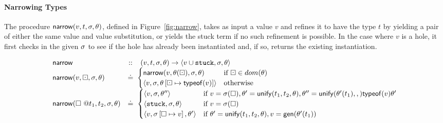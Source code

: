 \paragraph{Narrowing Types} The procedure $\force{v}{t}{\vsu}{\tsu}$,
defined in Figure~\ref{fig:narrow}, takes as input a value $v$ and
refines it to have the type $t$ by yielding a pair of either the same
value and value substitution, or yields the stuck term if no such
refinement is possible. In the case where $v$ is a hole, it first checks
in the given $\vsu$ to see if the hole has already been instantiated
and, if so, returns the existing instantiation.
%
\begin{figure*}[t]
$$
\begin{array}{lcl}
\forcesym                  & ::     & (v, t, \vsu, \tsu) \rightarrow \triple{v \cup \stuck}{\vsu}{\tsu} \\
\force{v}{\thole}{\vsu}{\tsu}  & \defeq & \hspace{-1ex}
\begin{cases}
  \force{v}{\subst{\tsu}{\thole}}{\vsu}{\tsu} & \mbox{if}\ \thole \in dom(\tsu) \\
  \triple{v}{\vsu}{\extendsu{\tsu}{\thole}{\typeof{v}}} & \mbox{otherwise} \\
\end{cases} \\
\force{\vhole{t_1}}{t_2}{\vsu}{\tsu} & \defeq & \hspace{-1ex}
\begin{cases}
  \triple{v}{\vsu}{\tsu''}    & \mbox{if } v = \lookupsu{\vsu}{\ehole},
                                         \tsu' = \unify{t_1}{t_2}{\tsu},
                                         \tsu'' = \unify{\subst{\tsu'}{t_1}}
                                                        {\typeof{v}}{\tsu'} \\
  \triple{\stuck}{\vsu}{\tsu} & \mbox{if } v = \lookupsu{\vsu}{\ehole} \\
  \triple{v}{\extendsu{\vsu}{\ehole}{v}}{\tsu'} & \mbox{if}\ \tsu' = \unify{t_1}{t_2}{\tsu}, v = \gen{\subst{\tsu'}{t_1}}\\
\end{cases} \\

\end{array}$$
\end{figure*}
